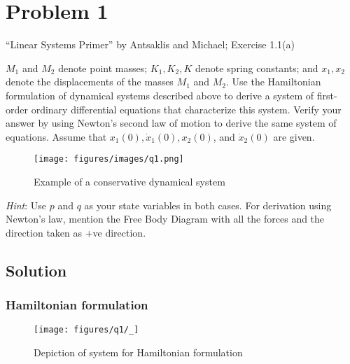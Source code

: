 \section*{Problem 1}

``Linear Systems Primer'' by Antsaklis and Michael;
Exercise 1.1(a)

\(M_1\) and \(M_2\) denote point masses; \(K_1, K_2, K\) denote spring constants; and \(x_1,x_2\) denote the displacements of the masses \(M_1\) and \(M_2\).
Use the Hamiltonian formulation of dynamical systems described above to derive a system of first-order ordinary differential equations that characterize this system.
Verify your answer by using Newton's second law of motion to derive the same system of equations.
Assume that \(x_1(0), \dot x_1(0), x_2(0)\), and \(\dot x_2(0)\) are given.

\begin{figure}[h]
    \centering
    \texttt{[image: figures/images/q1.png]}
    \caption{
        Example of a conservative dynamical system
    }\label{fig:q1}
\end{figure}

\textit{Hint}: Use \(p\) and \(q\) as your state variables in both cases.
For derivation using Newton's law, mention the Free Body Diagram with all the forces and the direction taken as +ve direction.

\subsection*{Solution}

\subsubsection*{Hamiltonian formulation}

\begin{figure}[htb]
    \centering
    \texttt{[image: figures/q1/\_]}
    \caption{
        Depiction of system for Hamiltonian formulation
    }\label{fig:q1-hamiltonian}
\end{figure}

